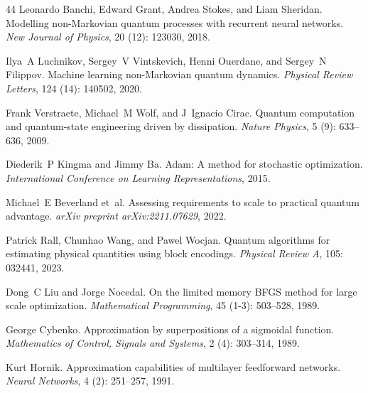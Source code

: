 \documentclass[11pt]{article}
\begin{document}
\begin{thebibliography}{44}
Leonardo Banchi, Edward Grant, Andrea Stokes, and Liam Sheridan.
\newblock Modelling non-{Markovian} quantum processes with recurrent neural
  networks.
\newblock \emph{New Journal of Physics}, 20 (12): 123030,
  2018.

Ilya~A Luchnikov, Sergey~V Vintskevich, Henni Ouerdane, and Sergey~N Filippov.
\newblock Machine learning non-{Markovian} quantum dynamics.
\newblock \emph{Physical Review Letters}, 124 (14): 140502,
  2020.

Frank Verstraete, Michael~M Wolf, and J~Ignacio Cirac.
\newblock Quantum computation and quantum-state engineering driven by
  dissipation.
\newblock \emph{Nature Physics}, 5 (9): 633--636, 2009.

Diederik~P Kingma and Jimmy Ba.
\newblock Adam: A method for stochastic optimization.
\newblock \emph{International Conference on Learning Representations}, 2015.

Michael~E Beverland et~al.
\newblock Assessing requirements to scale to practical quantum advantage.
\newblock \emph{arXiv preprint arXiv:2211.07629}, 2022.

Patrick Rall, Chunhao Wang, and Pawel Wocjan.
\newblock Quantum algorithms for estimating physical quantities using block
  encodings.
\newblock \emph{Physical Review A}, 105: 032441, 2023.

Dong~C Liu and Jorge Nocedal.
\newblock On the limited memory {BFGS} method for large scale optimization.
\newblock \emph{Mathematical Programming}, 45 (1-3):
  503--528, 1989.

George Cybenko.
\newblock Approximation by superpositions of a sigmoidal function.
\newblock \emph{Mathematics of Control, Signals and Systems}, 2
  (4): 303--314, 1989.

Kurt Hornik.
\newblock Approximation capabilities of multilayer feedforward networks.
\newblock \emph{Neural Networks}, 4 (2): 251--257, 1991.


\end{thebibliography}
\end{document}
